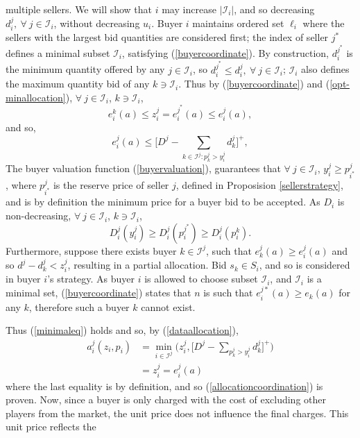 \documentclass[12pt]{article}
\theoremstyle{definition}
\newcommand{\mcI}{\mathcal{I}}
\begin{document}
\begin{multicols}{2}
multiple sellers.
We will show that $i$ may increase $\vert\mcI_i\vert$, and so decreasing
$d_i^j, \ \forall \ j\in\mcI_i$, without decreasing $u_i$.
Buyer $i$ maintains ordered set $\ell_i$ where the sellers with the
largest bid quantities are considered first; the index of seller $j^*$ defines
a minimal subset $\mcI_i$, satisfying (\ref{buyercoordinate}). By construction, 
$d_i^{j^*}$ is the minimum quantity offered by any $j\in \mcI_i$,
so $d_i^{j^*} \le d_i^j, \ \forall \ j \in \mcI_i$; $\mcI_i$ also defines the
maximum quantity bid of any $k \ni \mcI_i$.
Thus by (\ref{buyercoordinate}) and (\ref{opt-minallocation}), $\forall \ j\in \mcI_i$,
$k\ni\mcI_i$,
$$
    e_i^k(a) \le z_i^j = e_i^{j^*}(a) \le e_i^{j}(a),
$$
and so, 
\begin{equation}\label{minimaleq}
e_i^{j}(a)  \le \bigg\lbrack D^{j} - \sum_{k\in \mcI^j : p_k^{j}> y_{i}^{j}} d_k^{j}\bigg\rbrack^+,
\end{equation}
The buyer valuation function (\ref{buyervaluation}), guarantees
that $\forall \ j\in\mcI_i$, $y_i^j \ge p_{i^*}^j$, where $p_{i^*}^j$ is the reserve price of seller $j$, defined in Proposision
\ref{sellerstrategy}, and is by definition the minimum price for a buyer bid to
be accepted. 
As $D_i$ is non-decreasing, $\forall \ j\in \mcI_i$,
$k\ni\mcI_i$,
$$
    D_i^j(y_i^j) \ge D_i^j(p_i^{j^*})\ge D_i^j(p_i^{k}).
$$
Furthermore, suppose there exists buyer $k\in \mcI^j$, such that
$e_k^j(a) \ge e_i^j(a)$ and so $d^j - d_k^j < z_i^{j}$, resulting in a
partial allocation. Bid $s_k \in S_i$, and so is considered in buyer $i$'s strategy. 
As buyer $i$ is allowed to choose subset $\mcI_i$, and $\mcI_i$ is a minimal
set, (\ref{buyercoordinate}) states that $n$ is such that $e_i^{j*}(a)
\ge e_k(a)$ for any $k$, therefore such a buyer $k$ cannot exist.
\iffalse
We have, $\forall \ j\in \mcI_i$, $k\ni\mcI_i$,
$$
    {\theta_i}'(e_i^{k}(a)) \ge {\theta_i}'(e_i^{j^*}(a)) \ge y_i^j.
$$
Now, suppose that $p_k^j = p_i^j$, however $d_k^j > d_i^j$...
\fi
Thus (\ref{minimaleq}) holds and so, by (\ref{dataallocation}),
\begin{align*}
     a_i^j(z_i,p_i) &=\min_{i\in\mcI^j}\bigg(z_i^j, \bigg\lbrack D^{j} - \sum_{p_k^{j}> y_i^{j}}
d_k^{j}\bigg\rbrack^+\bigg) \\
    &= z_i^{j}= e_i^j(a)
\end{align*}
where the last equality is by definition, and so (\ref{allocationcoordination}) is proven.
Now, since a buyer is only charged with the cost of excluding other players from the market, the
unit price does not influence the final charges. This unit price reflects the

\end{multicols}
\end{document}
